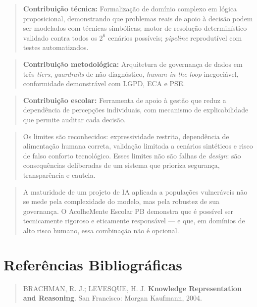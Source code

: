 \documentclass[11pt]{article}
\begin{document}
\begin{quote}
\textbf{Contribuição técnica:} Formalização de domínio complexo em
lógica proposicional, demonstrando que problemas reais de apoio à
decisão podem ser modelados com técnicas simbólicas; motor de resolução
determinístico validado contra todos os \(2^6\) cenários possíveis;
\emph{pipeline} reprodutível com testes automatizados.
\end{quote}

\begin{quote}
\textbf{Contribuição metodológica:} Arquitetura de governança de dados
em três \emph{tiers}, \emph{guardrails} de não diagnóstico,
\emph{human-in-the-loop} inegociável, conformidade demonstrável com
LGPD, ECA e PSE.
\end{quote}

\begin{quote}
\textbf{Contribuição escolar:} Ferramenta de apoio à gestão que reduz a
dependência de percepções individuais, com mecanismo de explicabilidade
que permite auditar cada decisão.
\end{quote}

\begin{quote}
Os limites são reconhecidos: expressividade restrita, dependência de
alimentação humana correta, validação limitada a cenários sintéticos e
risco de falso conforto tecnológico. Esses limites não são falhas de
\emph{design}: são consequências deliberadas de um sistema que prioriza
segurança, transparência e cautela.
\end{quote}

\begin{quote}
A maturidade de um projeto de IA aplicada a populações vulneráveis não
se mede pela complexidade do modelo, mas pela robustez de sua
governança. O AcolheMente Escolar PB demonstra que é possível ser
tecnicamente rigoroso e eticamente responsável --- e que, em domínios de
alto risco humano, essa combinação não é opcional.
\end{quote}

    \section{Referências
Bibliográficas}\label{referuxeancias-bibliogruxe1ficas}

\begin{quote}
BRACHMAN, R. J.; LEVESQUE, H. J. \textbf{Knowledge Representation and
Reasoning}. San Francisco: Morgan Kaufmann, 2004.
\end{quote}
\end{document}
